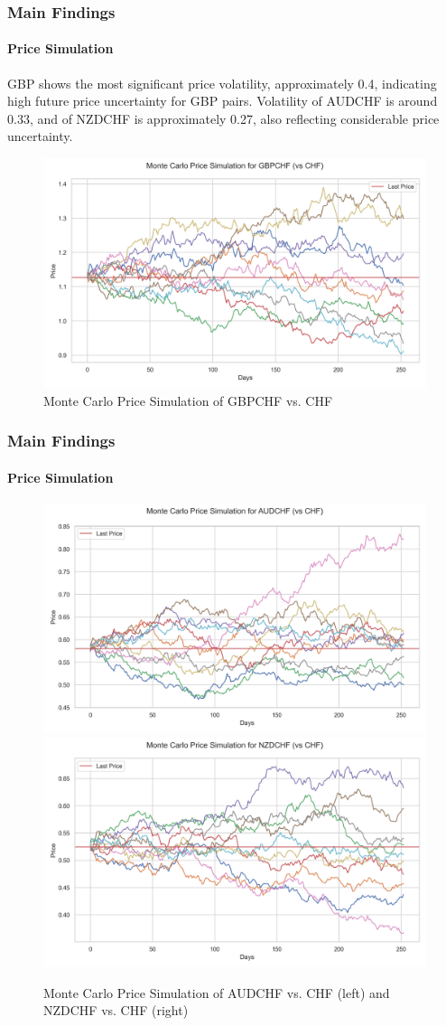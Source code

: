 \documentclass[10pt]{beamer}
\begin{document}
\begin{frame}
\frametitle{Main Findings}
\framesubtitle{Price Simulation}
GBP shows the most significant price volatility, approximately 0.4, indicating high future price uncertainty for GBP pairs. Volatility of AUDCHF is around 0.33, and of NZDCHF is approximately
0.27, also reflecting considerable price uncertainty.
\begin{figure}[h]
    \centering  \includegraphics[width=0.75\linewidth]{reports/figures/monte_carlo_price_simulation_GBPCHF_vs_CHF.png}
    \caption{Monte Carlo Price Simulation of GBPCHF vs. CHF}  \label{fig:monte_carlo_price_simulation_GBPCHF_vs_CHF}
\end{figure}
\end{frame}
\begin{frame}
\frametitle{Main Findings}
\framesubtitle{Price Simulation}
\begin{figure}[h]
    \centering
    \includegraphics[width=0.48\linewidth]{reports/figures/monte_carlo_price_simulation_AUDCHF_vs_CHF.png}    \label{fig:monte_carlo_price_simulation_AUDCHF_vs_CHF}
    \includegraphics[width=0.48\linewidth]{reports/figures/monte_carlo_price_simulation_NZDCHF_vs_CHF.png}  \label{fig:monte_carlo_price_simulation_NZDCHF_vs_CHF}
    \caption{Monte Carlo Price Simulation of AUDCHF vs. CHF (left) and NZDCHF vs. CHF (right)} 
\end{figure}
\end{frame}
\end{document}

